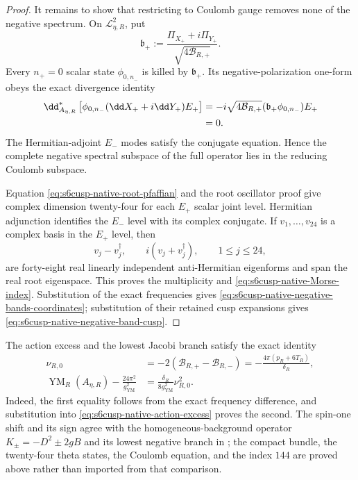 \begin{proof}
It remains to show that restricting to Coulomb gauge removes none of the
negative spectrum.  On \(\mathcal L_{\eta,R}^{2}\), put
\begin{equation*}
 \mathfrak b_+:=
 \frac{\Pi_{X_+}+i\Pi_{Y_+}}
 {\sqrt{4\mathcal B_{R,+}}}.
\end{equation*}
Every \(n_+=0\) scalar state \(\phi_{0,n_-}\) is killed by
\(\mathfrak b_+\).  Its negative-polarization one-form obeys the exact
divergence identity
\begin{align}
 \dd_{A_{\eta,R}}^*
 \left[\phi_{0,n_-}(\dd X_++i\dd Y_+)E_+\right]
 &=-i\sqrt{4\mathcal B_{R,+}}
   (\mathfrak b_+\phi_{0,n_-})E_+\notag\\
 &=0.
 \label{eq:s6cusp-native-negative-Coulomb-equation}
\end{align}
The Hermitian-adjoint \(E_-\) modes satisfy the conjugate equation.  Hence
the complete negative spectral subspace of the full operator lies in the
reducing Coulomb subspace.

Equation \eqref{eq:s6cusp-native-root-pfaffian} and the root oscillator
proof give complex dimension twenty-four for each \(E_+\) scalar joint
level.  Hermitian adjunction identifies the \(E_-\) level with its complex
conjugate.  If \(v_1,\ldots,v_{24}\) is a complex basis in the \(E_+\)
level, then
\begin{equation*}
 v_j-v_j^\dagger,
 \qquad i(v_j+v_j^\dagger),
 \qquad 1\le j\le24,
\end{equation*}
are forty-eight real linearly independent anti-Hermitian eigenforms and
span the real root eigenspace.  This proves the multiplicity and
\eqref{eq:s6cusp-native-Morse-index}.  Substitution of the exact frequencies
gives \eqref{eq:s6cusp-native-negative-bands-coordinates}; substitution of
their retained cusp expansions gives
\eqref{eq:s6cusp-native-negative-band-cusp}.
\end{proof}

The action excess and the lowest Jacobi branch satisfy the exact identity
\begin{align}
 \nu_{R,0}
 &=-2(\mathcal B_{R,+}-\mathcal B_{R,-})
  =-\frac{4\pi(p_R+6T_R)}{\delta_R},
 \label{eq:s6cusp-native-lowest-instability}\\
 \operatorname{YM}_R(A_{\eta,R})
 -\frac{24\pi^2}{g_{\mathrm{YM}}^2}
 &=\frac{\delta_R}{8g_{\mathrm{YM}}^2}\nu_{R,0}^2.
 \label{eq:s6cusp-native-action-instability}
\end{align}
Indeed, the first equality follows from the exact frequency difference, and
substitution into \eqref{eq:s6cusp-native-action-excess} proves the second.
The spin-one shift and its sign agree with the homogeneous-background
operator \(K_\pm=-D^2\pm2gB\) and its lowest negative branch in
\cite[eqs.~(1)--(3)]{Oxman2010}; the compact bundle, the twenty-four theta
states, the Coulomb equation, and the index \(144\) are proved above rather
than imported from that comparison.

